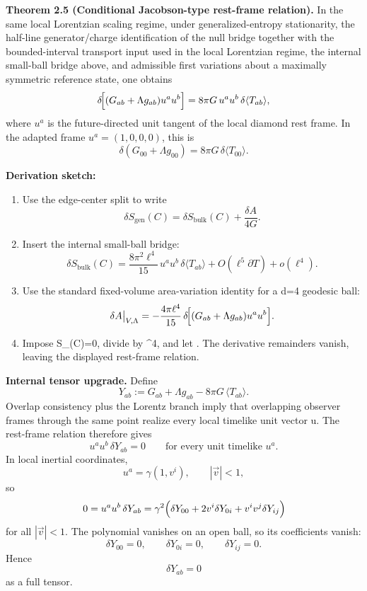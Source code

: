 \textbf{Theorem 2.5 (Conditional Jacobson-type rest-frame relation).} In the same local Lorentzian scaling regime, under generalized-entropy stationarity, the half-line generator/charge identification of the null bridge together with the bounded-interval transport input used in the local Lorentzian regime, the internal small-ball bridge above, and admissible first variations about a maximally symmetric reference state, one obtains
\[
\delta\!\Bigl[(G_{ab}+\Lambda g_{ab})u^a u^b\Bigr]
=
8\pi G\,u^a u^b\,\delta\langle T_{ab}\rangle,
\]
where \(u^a\) is the future-directed unit tangent of the local diamond rest frame. In the adapted frame \(u^a=(1,0,0,0)\), this is
\[
\delta\!\left(G_{00}+\Lambda g_{00}\right)=8\pi G\,\delta\langle T_{00}\rangle.
\]

\textbf{Derivation sketch:}

\begin{enumerate}
\def\labelenumi{\arabic{enumi}.}
\item
Use the edge-center split to write
\[
\delta S_{\mathrm{gen}}(C)
=
\delta S_{\mathrm{bulk}}(C)+\frac{\delta A}{4G}.
\]
\item
Insert the internal small-ball bridge:
\[
\delta S_{\mathrm{bulk}}(C)
=
\frac{8\pi^2\ell^4}{15}\,u^a u^b\,\delta\langle T_{ab}\rangle
+O(\ell^5\partial T)+o(\ell^4).
\]
\item
Use the standard fixed-volume area-variation identity for a d=4 geodesic ball:
\[
\delta A\big|_{V,\Lambda}
=
-\frac{4\pi\ell^4}{15}\,
\delta\!\Bigl[(G_{ab}+\Lambda g_{ab})u^a u^b\Bigr].
\]
\item
Impose \delta S_{}(C)=0, divide by \ell^4, and let \ell{}. The derivative remainders vanish, leaving the displayed rest-frame relation.
\end{enumerate}

\textbf{Internal tensor upgrade.} Define
\[
Y_{ab}:=G_{ab}+\Lambda g_{ab}-8\pi G\,\langle T_{ab}\rangle.
\]
Overlap consistency plus the Lorentz branch imply that overlapping observer frames through the same point realize every local timelike unit vector u. The rest-frame relation therefore gives
\[
u^a u^b\,\delta Y_{ab}=0
\qquad
\text{for every unit timelike }u^a.
\]
In local inertial coordinates,
\[
u^a=\gamma(1,v^i),
\qquad
|\vec v|<1,
\]
so
\[
0
=
u^a u^b\,\delta Y_{ab}
=
\gamma^2\Bigl(\delta Y_{00}+2v^i\delta Y_{0i}+v^iv^j\delta Y_{ij}\Bigr)
\]
for all \(|\vec v|<1\). The polynomial vanishes on an open ball, so its coefficients vanish:
\[
\delta Y_{00}=0,\qquad
\delta Y_{0i}=0,\qquad
\delta Y_{ij}=0.
\]
Hence
\[
\delta Y_{ab}=0
\]
as a full tensor.


